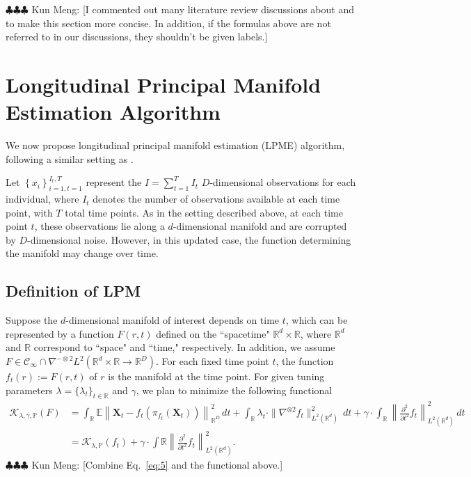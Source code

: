 \documentclass[11pt,reqno]{article}
\newcommand{\meng}[1]{{\color{purple} \sf $\clubsuit\clubsuit\clubsuit$ Kun Meng: [#1]}}
\theoremstyle{definition}
\begin{document}
\meng{I commented out many literature review discussions about \cite{hastiePrincipalCurves1989} and \cite{smolaRegularizedPrincipalManifolds2001} to make this section more concise. In addition, if the formulas above are not referred to in our discussions, they shouldn't be given labels.}

\section{Longitudinal Principal Manifold Estimation Algorithm}

We now propose longitudinal principal manifold estimation (LPME) algorithm, following a similar setting as \cite{mengPrincipalManifoldEstimation2021}. 

Let $\left\{x_i\right\}_{i=1, t=1}^{I_t, T}$ represent the $I = \sum_{t=1}^{T}I_t$ $D$-dimensional observations for each individual, where $I_t$ denotes the number of observations available at each time point, with $T$ total time points. As in the setting described above, at each time point $t$, these observations lie along a $d$-dimensional manifold and are corrupted by $D$-dimensional noise. However, in this updated case, the function determining the manifold may change over time.

\subsection{Definition of LPM}

Suppose the $d$-dimensional manifold of interest depends on time $t$, which can be represented by a function $F(r,t)$ defined on the ``spacetime" $\mathbb{R}^d\times\mathbb{R}$, where $\mathbb{R}^d$ and $\mathbb{R}$ correspond to ``space" and ``time," respectively. In addition, we assume $F\in\mathcal{C}_\infty\cap\nabla^{-\otimes2}L^2(\mathbb{R}^d\times\mathbb{R}\rightarrow\mathbb{R}^D)$. For each fixed time point $t$, the function $f_t(r):=F(r,t)$ of $r$ is the manifold at the time point. For given tuning parameters $\lambda=\{\lambda_t\}_{t\in\mathbb{R}}$ and $\gamma$, we plan to minimize the following functional
\begin{align}
  \mathcal{K}_{\lambda, \gamma, \mathbb{P}}(F) &= \int_\mathbb{R} \mathbb{E}\left\|\boldsymbol{X}_t - f_t\left(\pi_{f_t}(\boldsymbol{X}_t)\right)\right\|_{\mathbb{R}^{D}}^2 \, dt + \int_\mathbb{R} \lambda_t \cdot\|\nabla^{\otimes 2}f_t\|_{L^2(\mathbb{R}^{d})}^2 \, dt + \gamma\cdot \int_{\mathbb{R}}\left\|\frac{\partial^2}{\partial t^2}f_t\right\|_{L^2(\mathbb{R}^d)}^2 \, dt \label{eq:11} \\
  &= \mathcal{K}_{\lambda, \mathbb{P}}(f_t) + \gamma \cdot \int{\mathbb{R}}\left\|\frac{\partial^2}{\partial t^2}f_t\right\|_{L^2(\mathbb{R}^d)}^2 \nonumber
.\end{align}
\meng{Combine Eq.~\eqref{eq:5} and the functional above.}
\end{document}
